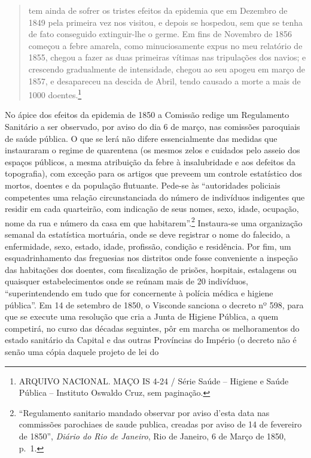 \begin{quote}
tem ainda de sofrer os tristes efeitos da epidemia que em Dezembro de
1849 pela primeira vez nos visitou, e depois se hospedou, sem que se
tenha de fato conseguido extinguir-lhe o germe. Em fins de Novembro de
1856 começou a febre amarela, como minuciosamente expus no meu relatório
de 1855, chegou a fazer as duas primeiras vítimas nas tripulações dos
navios; e crescendo gradualmente de intensidade, chegou ao seu apogeu em
março de 1857, e desapareceu na descida de Abril, tendo causado a morte
a mais de 1000 doentes.\footnote{ARQUIVO NACIONAL. MAÇO IS 4-24 / Série
  Saúde -- Higiene e Saúde Pública -- Instituto Oswaldo Cruz, sem
  paginação.}
\end{quote}

No ápice dos efeitos da epidemia de 1850 a Comissão redige um
Regulamento Sanitário a ser observado, por aviso do dia 6 de março, nas
comissões paroquiais de saúde pública. O que se lerá não difere
essencialmente das medidas que instauraram o regime de quarentena (os
mesmos zelos e cuidados pelo asseio dos espaços públicos, a mesma
atribuição da febre à insalubridade e aos defeitos da topografia), com
exceção para os artigos que preveem um controle estatístico dos mortos,
doentes e da população flutuante. Pede-se às ``autoridades policiais
competentes uma relação circunstanciada do número de indivíduos
indigentes que residir em cada quarteirão, com indicação de seus nomes,
sexo, idade, ocupação, nome da rua e número da casa em que
habitarem''.\footnote{``Regulamento sanitario mandado observar por aviso
  d'esta data nas commissões parochiaes de saude publica, creadas por
  aviso de 14 de fevereiro de 1850'', \emph{Diário do Rio de Janeiro},
  Rio de Janeiro, 6 de Março de 1850, p.~1.} Instaura-se uma organização
semanal da estatística mortuária, onde se deve registrar o nome do
falecido, a enfermidade, sexo, estado, idade, profissão, condição e
residência. Por fim, um esquadrinhamento das freguesias nos distritos
onde fosse conveniente a inspeção das habitações dos doentes, com
fiscalização de prisões, hospitais, estalagens ou quaisquer
estabelecimentos onde se reúnam mais de 20 indivíduos, ``superintendendo
em tudo que for concernente à polícia médica e higiene pública''. Em 14
de setembro de 1850, o Visconde sanciona o decreto nº 598, para que se
execute uma resolução que cria a Junta de Higiene Pública, a quem
competirá, no curso das décadas seguintes, pôr em marcha os
melhoramentos do estado sanitário da Capital e das outras Províncias do
Império (o decreto não é senão uma cópia daquele projeto de lei do
